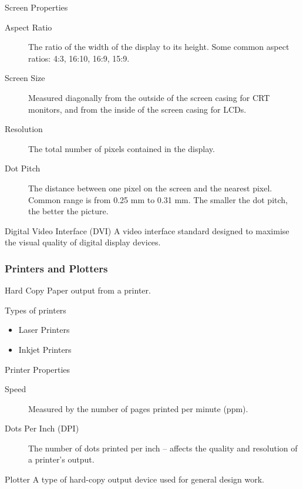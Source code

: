 \documentclass[\main/notes.tex]{subfiles}
\begin{document}
					\begin{sidenote}{Screen Properties}
						\begin{description}
							\item[Aspect Ratio] The ratio of the width of the display to its height. Some common aspect ratios: 4:3, 16:10, 16:9, 15:9.
							\item[Screen Size] Measured diagonally from the outside of the screen casing for CRT monitors, and from the inside of the screen casing for LCDs.
							\item[Resolution] The total number of pixels contained in the display.
							\item[Dot Pitch] The distance between one pixel on the screen and the nearest pixel. Common range is from 0.25 mm to 0.31 mm. The smaller the dot pitch, the better the picture.
						\end{description}
					\end{sidenote}
					\begin{definition}{Digital Video Interface (DVI)}
						A video interface standard designed to maximise the visual quality of digital display devices.
					\end{definition}
				\subsubsection{Printers and Plotters}
					\begin{definition}{Hard Copy}
						Paper output from a printer.
					\end{definition}
					\begin{sidenote}{Types of printers}
						\begin{multicols}{2}
							\begin{itemize}[nosep]
								\item Laser Printers
								\item Inkjet Printers
							\end{itemize}
						\end{multicols}
					\end{sidenote}
					\begin{sidenote}{Printer Properties}
						\begin{description}
							\item[Speed] Measured by the number of pages printed per minute (ppm).
							\item[Dots Per Inch (DPI)] The number of dots printed per inch -- affects the quality and resolution of a printer's output.  
						\end{description}
					\end{sidenote}
					\begin{definition}{Plotter}
						A type of hard-copy output device used for general design work.
					\end{definition}
\end{document}
